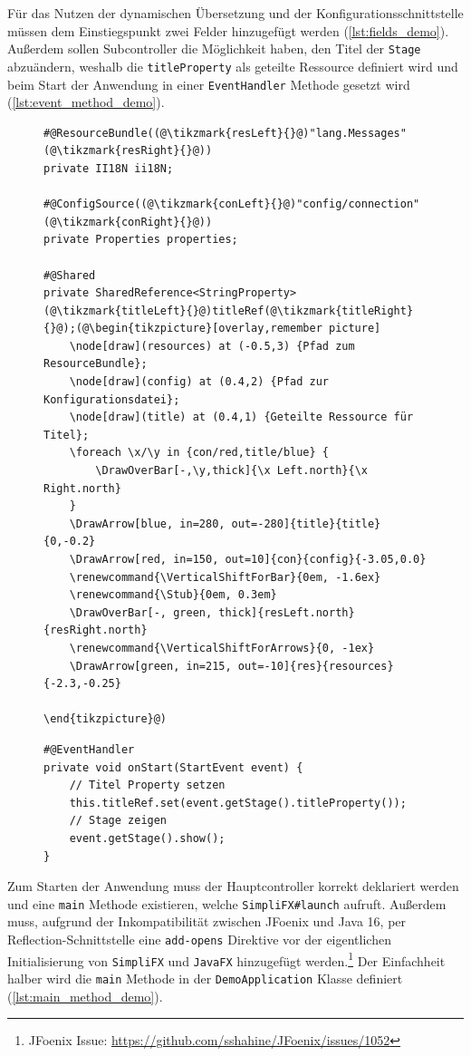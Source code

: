 \noindent Für das Nutzen der dynamischen Übersetzung und der Konfigurationsschnittstelle müssen dem Einstiegspunkt zwei Felder hinzugefügt werden (\autoref{lst:fields_demo}). Außerdem sollen Subcontroller die Möglichkeit haben, den Titel der \texttt{Stage} abzuändern, weshalb die \texttt{titleProperty} als geteilte Ressource definiert wird und beim Start der Anwendung in einer \texttt{EventHandler} Methode gesetzt wird (\autoref{lst:event_method_demo}).
\begin{figure}[H]
	\begin{lstlisting}[caption=Demo -- Benötigte Felder., captionpos=b, label=lst:fields_demo]
#@ResourceBundle((@\tikzmark{resLeft}{}@)"lang.Messages"(@\tikzmark{resRight}{}@))
private II18N ii18N;

#@ConfigSource((@\tikzmark{conLeft}{}@)"config/connection"(@\tikzmark{conRight}{}@))
private Properties properties;

#@Shared
private SharedReference<StringProperty> (@\tikzmark{titleLeft}{}@)titleRef(@\tikzmark{titleRight}{}@);(@\begin{tikzpicture}[overlay,remember picture]
	\node[draw](resources) at (-0.5,3) {Pfad zum ResourceBundle};
	\node[draw](config) at (0.4,2) {Pfad zur Konfigurationsdatei};
	\node[draw](title) at (0.4,1) {Geteilte Ressource für Titel};
	\foreach \x/\y in {con/red,title/blue} {
		\DrawOverBar[-,\y,thick]{\x Left.north}{\x Right.north}
	}
	\DrawArrow[blue, in=280, out=-280]{title}{title}{0,-0.2}
	\DrawArrow[red, in=150, out=10]{con}{config}{-3.05,0.0}
	\renewcommand{\VerticalShiftForBar}{0em, -1.6ex}
	\renewcommand{\Stub}{0em, 0.3em}
	\DrawOverBar[-, green, thick]{resLeft.north}{resRight.north}
	\renewcommand{\VerticalShiftForArrows}{0, -1ex}
	\DrawArrow[green, in=215, out=-10]{res}{resources}{-2.3,-0.25}

\end{tikzpicture}@)
	\end{lstlisting}
\end{figure}
\begin{figure}[H]
	\begin{lstlisting}[caption=Demo -- Start EventHandler., captionpos=b, label=lst:event_method_demo]
#@EventHandler
private void onStart(StartEvent event) {
	// Titel Property setzen
    this.titleRef.set(event.getStage().titleProperty());
	// Stage zeigen
    event.getStage().show();
}
	\end{lstlisting}
\end{figure}
\noindent Zum Starten der Anwendung muss der Hauptcontroller korrekt deklariert werden und eine \texttt{main} Methode existieren, welche \texttt{SimpliFX\#launch} aufruft. Außerdem muss, aufgrund der Inkompatibilität zwischen JFoenix und Java 16, per Reflection-Schnittstelle eine \texttt{add-opens} Direktive vor der eigentlichen Initialisierung von \texttt{SimpliFX} und \texttt{JavaFX} hinzugefügt werden.\footnote{JFoenix Issue: \url{https://github.com/sshahine/JFoenix/issues/1052}} Der Einfachheit halber wird die \texttt{main} Methode in der \texttt{DemoApplication} Klasse definiert (\autoref{lst:main_method_demo}).
